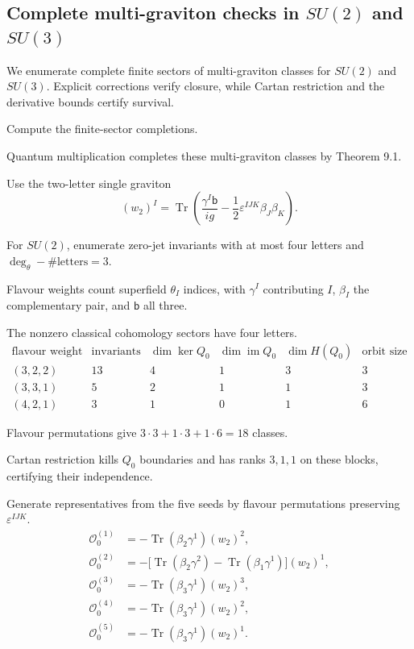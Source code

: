 \documentclass[11pt]{article}
\numberwithin{equation}{section}
\numberwithin{figure}{section}
\numberwithin{table}{section}
\begin{document}
\subsection{Complete multi-graviton checks in $SU(2)$ and $SU(3)$}\label{sec-finite-sectors}

We enumerate complete finite sectors of multi-graviton classes for $SU(2)$ and $SU(3)$. Explicit corrections verify closure, while Cartan restriction and the derivative bounds certify survival.

\begin{proofbox}
Compute the finite-sector completions.

Quantum multiplication completes these multi-graviton classes by Theorem 9.1.

Use the two-letter single graviton \cite[Eq. (2.14)]{KKLP}
\begin{equation}\label{eq-w2}
(w_2)^I=\operatorname{Tr}\!\left(
\frac{\gamma^I\mathsf b}{ig}
-\frac12\varepsilon^{IJK}\beta_J\beta_K\right).
\end{equation}

For $SU(2)$, enumerate zero-jet invariants with at most four letters and $\deg_\theta-\#\text{letters}=3$.

Flavour weights count superfield $\theta_I$ indices, with $\gamma^I$ contributing $I$, $\beta_I$ the complementary pair, and $\mathsf b$ all three.

The nonzero classical cohomology sectors have four letters.
\begin{equation}\label{b-00809}
\begin{array}{c|rrrrr}
\text{flavour weight}&\text{invariants}&\dim\ker Q_0&
\dim\operatorname{im}Q_0&\dim H(Q_0)&\text{orbit size}\\\hline
(3,2,2)&13&4&1&3&3\\
(3,3,1)&5&2&1&1&3\\
(4,2,1)&3&1&0&1&6
\end{array}
\end{equation}

Flavour permutations give $3\cdot3+1\cdot3+1\cdot6=18$ classes.

Cartan restriction kills $Q_0$ boundaries and has ranks $3,1,1$ on these blocks, certifying their independence.

Generate representatives from the five seeds by flavour permutations preserving $\varepsilon^{IJK}$.
\begin{equation}\label{b-00811}
\begin{aligned}
\mathcal O_0^{(1)}&=-\operatorname{Tr}(\beta_2\gamma^1)(w_2)^2,\\
\mathcal O_0^{(2)}&=-\bigl[\operatorname{Tr}(\beta_2\gamma^2)
-\operatorname{Tr}(\beta_1\gamma^1)\bigr](w_2)^1,\\
\mathcal O_0^{(3)}&=-\operatorname{Tr}(\beta_3\gamma^1)(w_2)^3,\\
\mathcal O_0^{(4)}&=-\operatorname{Tr}(\beta_3\gamma^1)(w_2)^2,\\
\mathcal O_0^{(5)}&=-\operatorname{Tr}(\beta_3\gamma^1)(w_2)^1.
\end{aligned}
\end{equation}


\end{proofbox}
\end{document}
